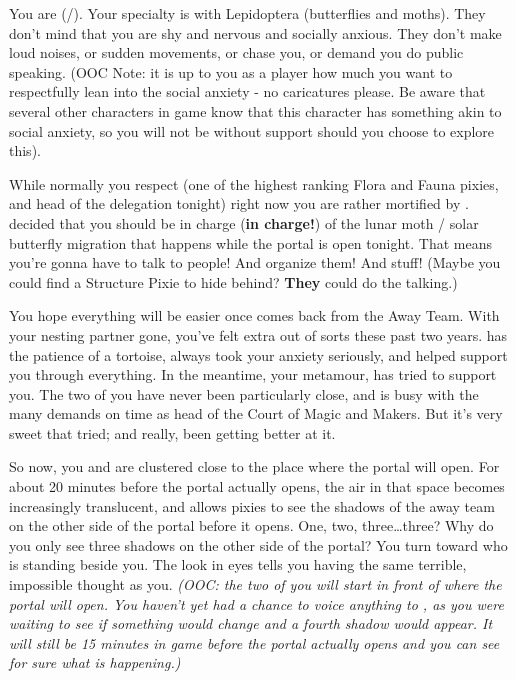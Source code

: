 \documentclass[char]{PP}
\begin{document}
\name{\cFButterfly{}}

You are \cFButterfly{} (\cFButterfly{\They}/\cFButterfly{\Them}). Your specialty is with Lepidoptera (butterflies and moths). They don’t mind that you are shy and nervous and socially anxious. They don’t make loud noises, or sudden movements, or chase you, or demand you do public speaking. (OOC Note: it is up to you as a player how much you want to respectfully lean into the social anxiety - no caricatures please. Be aware that several other characters in game know that this character has something akin to social anxiety, so you will not be without support should you choose to explore this).

While normally you respect \cFHead{} (one of the highest ranking Flora and Fauna pixies, and head of the delegation tonight) right now you are rather mortified by \cFHead{\them}. \cFHead{} decided that you should be in charge (\textbf{in charge!}) of the lunar moth / solar butterfly migration that happens while the portal is open tonight. That means you’re gonna have to talk to people! And organize them! And stuff! (Maybe you could find a Structure Pixie to hide behind? \textbf{They} could do the talking.)

You hope everything will be easier once \cFLost{} comes back from the Away Team. With your nesting partner gone, you’ve felt extra out of sorts these past two years. \cFLost{} has the patience of a tortoise, always took your anxiety seriously, and helped support you through everything. In the meantime, your metamour, \cMHead{} has tried to support you. The two of you have never been particularly close, and \cMHead{} is busy with the many demands on \cMHead{\their} time as head of the Court of Magic and Makers. But it’s very sweet that \cMHead{\they} \cMHead{\have} tried; and really, \cMHead{\they} \cMHead{\have} been getting better at it.

So now, you and \cMHead{} are clustered close to the place where the portal will open. For about 20 minutes before the portal actually opens, the air in that space becomes increasingly translucent, and allows pixies to see the shadows of the away team on the other side of the portal before it opens. One, two, three\ldots three? Why do you only see three shadows on the other side of the portal?  You turn toward \cMHead{} who is standing beside you. The look in \cMHead{\their} eyes tells you \cMHead{\they} \cMHead{\are} having the same terrible, impossible thought as you. \textit{(OOC: the two of you will start in front of where the portal will open. You haven’t yet had a chance to voice anything to \cFButterfly{}, as you were waiting to see if something would change and a fourth shadow would appear. It will still be 15 minutes in game before the portal actually opens and you can see for sure what is happening.)}
\end{document}
